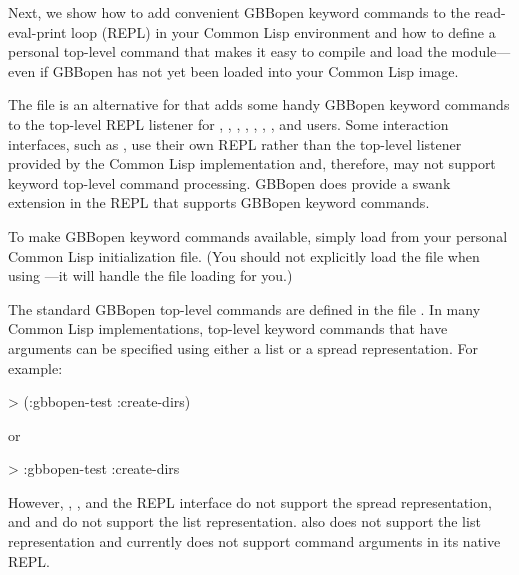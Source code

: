 \documentclass[10pt,twoside,english,pdftex]{article}
\begin{document}
Next, we show how to add convenient GBBopen keyword commands to the
read-eval-print loop (REPL) in your Common Lisp environment and how to
define a personal top-level command that makes it easy to compile and load
the  module---even if GBBopen has not yet been loaded into
your Common Lisp image.

%

%
The file is an
alternative for  that adds
some handy GBBopen keyword commands to the top-level REPL listener for
,
,
,
,
,
,
,
 and
users.  Some interaction
interfaces, such as ,
use their own REPL rather than the top-level listener
provided by the Common Lisp implementation and, therefore, may not support
keyword top-level command processing.  GBBopen does provide a swank extension
in the  REPL that
supports GBBopen keyword commands.

To make GBBopen keyword commands available, simply load
 from your personal
Common Lisp initialization file.  (You should not explicitly load the
 file when using
---it will handle the
 file loading for you.)

The standard GBBopen top-level commands are defined in the file
. 
In many Common Lisp implementations, top-level keyword commands that have
arguments can be specified using either a list or a spread representation.
For example:

\begin{example}
> (:gbbopen-test :create-dirs)
\end{example}
or
\begin{example}
> :gbbopen-test :create-dirs
\end{example}
However, ,
, and the
 REPL interface do not
support the spread representation, and  and
 do not support the list
representation.   also does not
support the list representation and currently does not support command
arguments in its native REPL.
\end{document}
